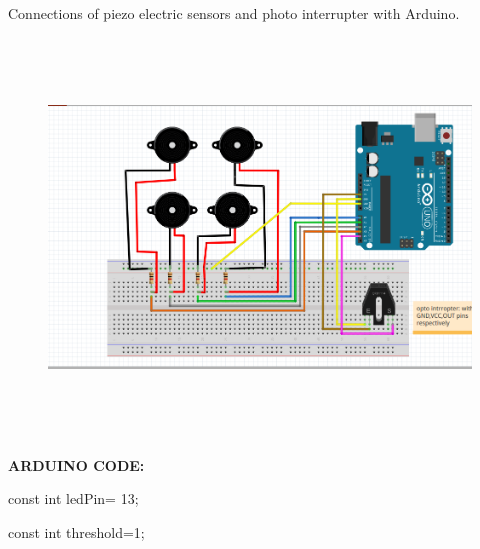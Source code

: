 \documentclass[12pt]{article}
\begin{document}
\vspace{\baselineskip}
{\fontsize{14pt}{16.8pt}\selectfont Connections of piezo electric sensors and photo interrupter with Arduino.\par}\par

\vspace{\baselineskip}


\begin{figure}[H]
	\begin{Center}
		\includegraphics[width=6.69in,height=4.16in]{./media/image1.png}
	\end{Center}
\end{figure}



\vspace{\baselineskip}
{\fontsize{14pt}{16.8pt}\selectfont \textbf{ARDUINO CODE:}\par}\par

\vspace{\baselineskip}
{\fontsize{14pt}{16.8pt}\selectfont const int ledPin= 13;\par}\par

{\fontsize{14pt}{16.8pt}\selectfont const int threshold=1;\par}\par
\end{document}
